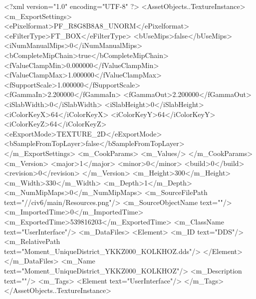 <?xml version="1.0" encoding="UTF-8" ?>
<AssetObjects..TextureInstance>
	<m_ExportSettings>
		<ePixelformat>PF_R8G8B8A8_UNORM</ePixelformat>
		<eFilterType>FT_BOX</eFilterType>
		<bUseMips>false</bUseMips>
		<iNumManualMips>0</iNumManualMips>
		<bCompleteMipChain>true</bCompleteMipChain>
		<fValueClampMin>0.000000</fValueClampMin>
		<fValueClampMax>1.000000</fValueClampMax>
		<fSupportScale>1.000000</fSupportScale>
		<fGammaIn>2.200000</fGammaIn>
		<fGammaOut>2.200000</fGammaOut>
		<iSlabWidth>0</iSlabWidth>
		<iSlabHeight>0</iSlabHeight>
		<iColorKeyX>64</iColorKeyX>
		<iColorKeyY>64</iColorKeyY>
		<iColorKeyZ>64</iColorKeyZ>
		<eExportMode>TEXTURE_2D</eExportMode>
		<bSampleFromTopLayer>false</bSampleFromTopLayer>
	</m_ExportSettings>
	<m_CookParams>
		<m_Values/>
	</m_CookParams>
	<m_Version>
		<major>1</major>
		<minor>0</minor>
		<build>0</build>
		<revision>0</revision>
	</m_Version>
	<m_Height>300</m_Height>
	<m_Width>330</m_Width>
	<m_Depth>1</m_Depth>
	<m_NumMipMaps>0</m_NumMipMaps>
	<m_SourceFilePath text="//civ6/main/Resources\kolkhoz.png"/>
	<m_SourceObjectName text=""/>
	<m_ImportedTime>0</m_ImportedTime>
	<m_ExportedTime>539816203</m_ExportedTime>
	<m_ClassName text="UserInterface"/>
	<m_DataFiles>
		<Element>
			<m_ID text="DDS"/>
			<m_RelativePath text="Moment_UniqueDistrict_YKKZ000_KOLKHOZ.dds"/>
		</Element>
	</m_DataFiles>
	<m_Name text="Moment_UniqueDistrict_YKKZ000_KOLKHOZ"/>
	<m_Description text=""/>
	<m_Tags>
		<Element text="UserInterface"/>
	</m_Tags>
</AssetObjects..TextureInstance>

